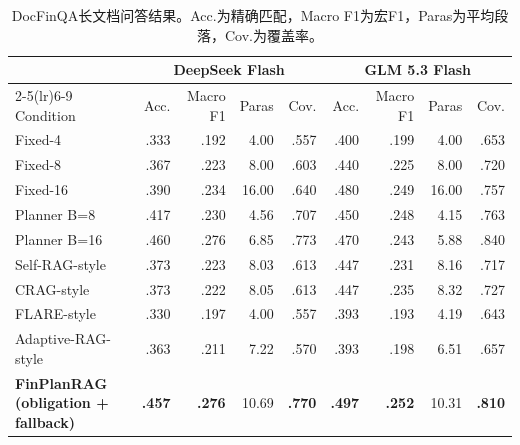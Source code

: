 \begin{table}[htbp]
\centering
{}
\setlength{\tabcolsep}{2pt}
\caption{DocFinQA长文档问答结果。Acc.为精确匹配，Macro F1为宏F1，Paras为平均段落，Cov.为覆盖率。}
\label{tab:docfinqa}
\begin{tabular}{lrrrrrrrr}
\toprule
 & \multicolumn{4}{c}{DeepSeek Flash} & \multicolumn{4}{c}{GLM 5.3 Flash} \\
\cmidrule(lr){2-5}\cmidrule(lr){6-9}
Condition & Acc. & Macro F1 & Paras & Cov. & Acc. & Macro F1 & Paras & Cov. \\
\midrule
Fixed-4 & .333 & .192 & 4.00 & .557 & .400 & .199 & 4.00 & .653 \\
Fixed-8 & .367 & .223 & 8.00 & .603 & .440 & .225 & 8.00 & .720 \\
Fixed-16 & .390 & .234 & 16.00 & .640 & .480 & .249 & 16.00 & .757 \\
Planner B=8 & .417 & .230 & 4.56 & .707 & .450 & .248 & 4.15 & .763 \\
Planner B=16 & .460 & .276 & 6.85 & .773 & .470 & .243 & 5.88 & .840 \\
Self-RAG-style & .373 & .223 & 8.03 & .613 & .447 & .231 & 8.16 & .717 \\
CRAG-style & .373 & .222 & 8.05 & .613 & .447 & .235 & 8.32 & .727 \\
FLARE-style & .330 & .197 & 4.00 & .557 & .393 & .193 & 4.19 & .643 \\
Adaptive-RAG-style & .363 & .211 & 7.22 & .570 & .393 & .198 & 6.51 & .657 \\
\midrule
\textbf{FinPlanRAG (obligation + fallback)} & \textbf{.457} & \textbf{.276} & 10.69 & \textbf{.770} & \textbf{.497} & \textbf{.252} & 10.31 & \textbf{.810} \\
\bottomrule
\end{tabular}
\end{table}
